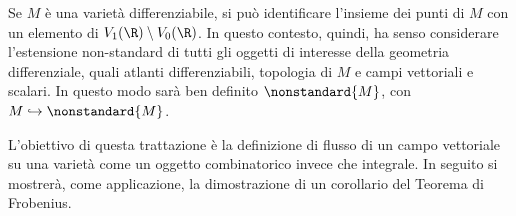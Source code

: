 Se $ M $ è una varietà differenziabile, si può identificare l'insieme dei punti di $ M $ con un elemento di $ V_1(\R)\setminus V_0(\R) $. In questo contesto, quindi, ha senso considerare l'estensione non-standard di tutti gli oggetti di interesse della geometria differenziale, quali atlanti differenziabili, topologia di $ M $ e campi vettoriali e scalari. In questo modo sarà ben definito $ \nonstandard{M} $, con $ M \hookrightarrow \nonstandard{M} $.

L'obiettivo di questa trattazione è la definizione di flusso di un campo vettoriale su una varietà come un oggetto combinatorico invece che integrale. In seguito si mostrerà, come applicazione, la dimostrazione di un corollario del Teorema di Frobenius. 






